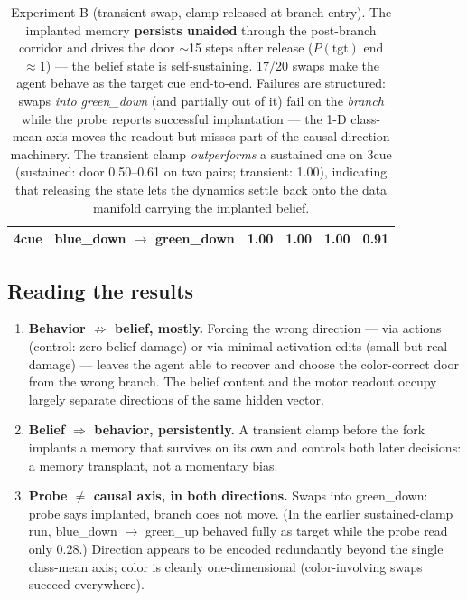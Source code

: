 \documentclass[11pt]{article}
\newcommand{\ok}[1]{\textcolor{envgreen}{#1}}
\begin{document}
\begin{table}[h]
\begin{tabular}{llcccc}
4cue & blue\_down $\rightarrow$ green\_down & 1.00 & 1.00 & \ok{1.00} & 0.91 \\
\bottomrule
\end{tabular}
\caption{Experiment B (transient swap, clamp released at branch entry). The implanted memory
\textbf{persists unaided} through the post-branch corridor and drives the door $\sim$15 steps
after release ($P(\text{tgt})$ end $\approx 1$) --- the belief state is self-sustaining. 17/20
swaps make the agent behave as the target cue end-to-end. Failures are structured: swaps
\emph{into green\_down} (and partially out of it) fail on the \emph{branch} while the probe
reports successful implantation --- the 1-D class-mean axis moves the readout but misses part of
the causal direction machinery. The transient clamp \emph{outperforms} a sustained one on 3cue
(sustained: door 0.50--0.61 on two pairs; transient: 1.00), indicating that releasing the state
lets the dynamics settle back onto the data manifold carrying the implanted belief.}
\label{tab:expB}
\end{table}

\subsection{Reading the results}

\begin{enumerate}
  \item \textbf{Behavior $\not\Rightarrow$ belief, mostly.} Forcing the wrong direction --- via
        actions (control: zero belief damage) or via minimal activation edits (small but real
        damage) --- leaves the agent able to recover and choose the color-correct door from the
        wrong branch. The belief content and the motor readout occupy largely separate directions
        of the same hidden vector.
  \item \textbf{Belief $\Rightarrow$ behavior, persistently.} A transient clamp before the fork
        implants a memory that survives on its own and controls both later decisions: a memory
        transplant, not a momentary bias.
  \item \textbf{Probe $\neq$ causal axis, in both directions.} Swaps into green\_down: probe says
        implanted, branch does not move. (In the earlier sustained-clamp run, blue\_down
        $\rightarrow$ green\_up behaved fully as target while the probe read only 0.28.)
        Direction appears to be encoded redundantly beyond the single class-mean axis; color is
        cleanly one-dimensional (color-involving swaps succeed everywhere).
\end{enumerate}
\end{document}
